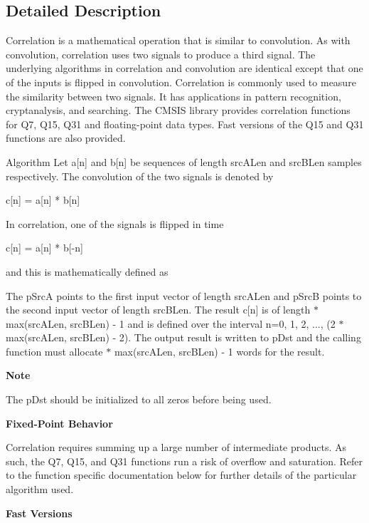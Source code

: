 \subsection{Detailed Description}
Correlation is a mathematical operation that is similar to convolution. As with convolution, correlation uses two signals to produce a third signal. The underlying algorithms in correlation and convolution are identical except that one of the inputs is flipped in convolution. Correlation is commonly used to measure the similarity between two signals. It has applications in pattern recognition, cryptanalysis, and searching. The C\-M\-S\-I\-S library provides correlation functions for Q7, Q15, Q31 and floating-\/point data types. Fast versions of the Q15 and Q31 functions are also provided.

\begin{DoxyParagraph}{Algorithm }
Let {\ttfamily a\mbox{[}n\mbox{]}} and {\ttfamily b\mbox{[}n\mbox{]}} be sequences of length {\ttfamily src\-A\-Len} and {\ttfamily src\-B\-Len} samples respectively. The convolution of the two signals is denoted by 
\begin{DoxyPre}    
                  c[n] = a[n] * b[n]    
\end{DoxyPre}
 In correlation, one of the signals is flipped in time 
\begin{DoxyPre}    
                  c[n] = a[n] * b[-n]    
\end{DoxyPre}

\end{DoxyParagraph}
\begin{DoxyParagraph}{}
and this is mathematically defined as  
\end{DoxyParagraph}
\begin{DoxyParagraph}{}
The {\ttfamily p\-Src\-A} points to the first input vector of length {\ttfamily src\-A\-Len} and {\ttfamily p\-Src\-B} points to the second input vector of length {\ttfamily src\-B\-Len}. The result {\ttfamily c\mbox{[}n\mbox{]}} is of length { $\ast$ max(src\-A\-Len, src\-B\-Len) -\/ 1} and is defined over the interval {\ttfamily n=0, 1, 2, ..., (2 $\ast$ max(src\-A\-Len, src\-B\-Len) -\/ 2)}. The output result is written to {\ttfamily p\-Dst} and the calling function must allocate { $\ast$ max(src\-A\-Len, src\-B\-Len) -\/ 1} words for the result.
\end{DoxyParagraph}
{\bfseries Note} \begin{DoxyParagraph}{}
The {\ttfamily p\-Dst} should be initialized to all zeros before being used.
\end{DoxyParagraph}
{\bfseries Fixed-\/\-Point Behavior} \begin{DoxyParagraph}{}
Correlation requires summing up a large number of intermediate products. As such, the Q7, Q15, and Q31 functions run a risk of overflow and saturation. Refer to the function specific documentation below for further details of the particular algorithm used.
\end{DoxyParagraph}
{\bfseries Fast Versions}

